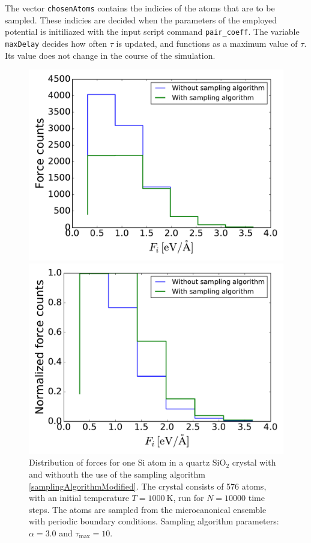 \documentclass[twoside,english]{uiofysmaster}
\begin{document}
The vector \texttt{chosenAtoms} contains the indicies of the atoms that are to be sampled. These indicies are decided
when the parameters of the employed potential is initiliazed with the input script command \texttt{pair\_coeff}. 
The variable \texttt{maxDelay} decides how often $\tau$ is updated, and functions as a maximum value of $\tau$. 
Its value does not change in the course of the simulation. 
\begin{figure}[H]
\begin{minipage}[t]{0.48\linewidth}
  \subcaption{}
  \includegraphics[width=\textwidth]{Figures/Implementation/forceDistSamplingAlgo.pdf}
\end{minipage}
\quad
\begin{minipage}[t]{0.48\linewidth}
\subcaption{}
\includegraphics[width=\textwidth]{Figures/Implementation/forceDistSamplingAlgoNormed.pdf}
\end{minipage}
  \caption{Distribution of forces for one Si atom in a quartz $\textrm{SiO}_2$ crystal with 
	   and withouth the use of the sampling algorithm \eqref{samplingAlgorithmModified}. 
	   The crystal consists of 576 atoms, with an initial temperature $T= \SI{1000}{\kelvin}$, 
	   run for $N = 10000$ time steps. The atoms are sampled from the microcanonical ensemble with
	   periodic boundary conditions.
	   Sampling algorithm parameters: $\alpha=3.0$ and 
	   $\tau_\textrm{max} = 10$.}
\label{fig:forceDistSamplingAlgo}
\end{figure}
\end{document}

